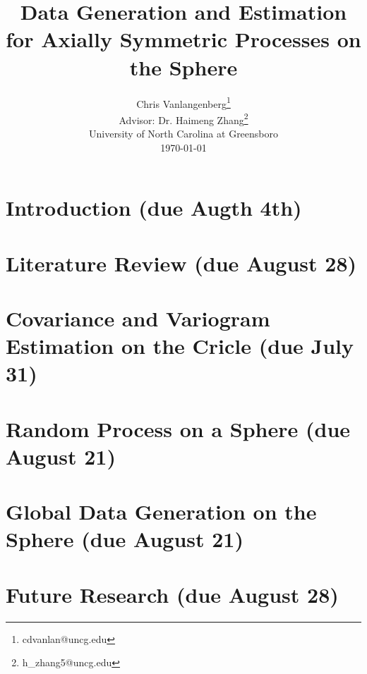
\usepackage{graphicx}

\usepackage{Sweave}




\title{{\bf\Large Data Generation and Estimation for Axially Symmetric Processes on the Sphere }}


\author{Chris Vanlangenberg\footnote{cdvanlan@uncg.edu} \\
\bigskip
Advisor: Dr. Haimeng Zhang\footnote{h\_zhang5@uncg.edu}\\ \small{University of North Carolina at Greensboro}\\
\small \today}

\maketitle 
\thispagestyle{empty}



\newpage
\chapter{Introduction (due Augth 4th)}


\chapter{Literature Review (due August 28)}



\chapter{Covariance and Variogram Estimation on the Cricle (due July 31)}


\chapter{Random Process on a Sphere (due August 21) }


\chapter{Global Data Generation on the Sphere (due August 21)}


\chapter{Future Research (due August 28)}




